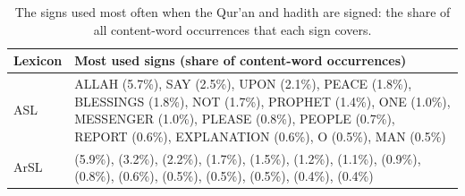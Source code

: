 \begin{table}[ht]
\centering\small
\caption{The signs used most often when the Qur'an and hadith are signed: the share of all content-word
occurrences that each sign covers.}
\label{tab:eda_signs}
\begin{tabularx}{\textwidth}{l Y}
\toprule
Lexicon & Most used signs (share of content-word occurrences) \\
\midrule
ASL & ALLAH (5.7\%), SAY (2.5\%), UPON (2.1\%), PEACE (1.8\%), BLESSINGS (1.8\%), NOT (1.7\%), PROPHET (1.4\%), ONE (1.0\%), MESSENGER (1.0\%), PLEASE (0.8\%), PEOPLE (0.7\%), REPORT (0.6\%), EXPLANATION (0.6\%), O (0.5\%), MAN (0.5\%) \\
ArSL &  (5.9\%),  (3.2\%),  (2.2\%),  (1.7\%),  (1.5\%),  (1.2\%),  (1.1\%),  (0.9\%),  (0.8\%),  (0.6\%),  (0.5\%),  (0.5\%),  (0.5\%),  (0.4\%),  (0.4\%) \\
\bottomrule
\end{tabularx}
\end{table}
